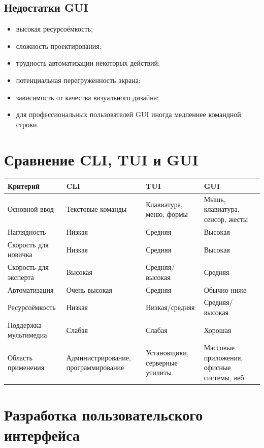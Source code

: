 \documentclass[12pt,a4paper]{article}
\begin{document}
\subsection{Недостатки GUI}

\begin{itemize}
    \item высокая ресурсоёмкость;
    \item сложность проектирования;
    \item трудность автоматизации некоторых действий;
    \item потенциальная перегруженность экрана;
    \item зависимость от качества визуального дизайна;
    \item для профессиональных пользователей GUI иногда медленнее командной строки.
\end{itemize}

\section{Сравнение CLI, TUI и GUI}

\begin{longtable}{p{3.3cm}p{3.7cm}p{3.7cm}p{3.7cm}}
\toprule
\textbf{Критерий} & \textbf{CLI} & \textbf{TUI} & \textbf{GUI} \\
\midrule
Основной ввод & Текстовые команды & Клавиатура, меню, формы & Мышь, клавиатура, сенсор, жесты \\
Наглядность & Низкая & Средняя & Высокая \\
Скорость для новичка & Низкая & Средняя & Высокая \\
Скорость для эксперта & Высокая & Средняя/высокая & Средняя \\
Автоматизация & Очень высокая & Средняя & Обычно ниже \\
Ресурсоёмкость & Низкая & Низкая/средняя & Средняя/высокая \\
Поддержка мультимедиа & Слабая & Слабая & Хорошая \\
Область применения & Администрирование, программирование & Установщики, серверные утилиты & Массовые приложения, офисные системы, веб \\
\bottomrule
\end{longtable}

\section{Разработка пользовательского интерфейса}
\end{document}
